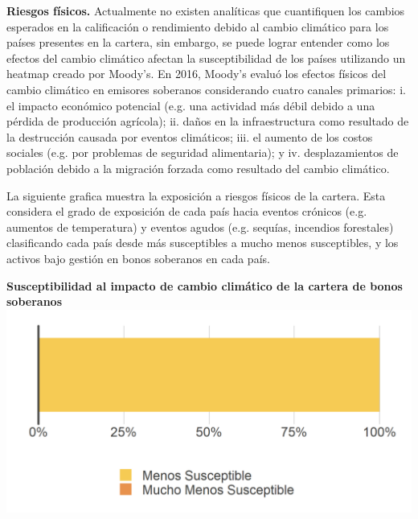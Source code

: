 \documentclass[10pt,table]{article}\usepackage[]{graphicx}\usepackage[]{color}
\begin{document}
\begin{multicols}{2}
	 
		
		\textbf{Riesgos físicos.} Actualmente no existen analíticas que cuantifiquen los cambios esperados en la calificación o rendimiento debido al cambio climático para los países presentes en la cartera, sin embargo, se puede lograr entender como los efectos del cambio climático afectan la susceptibilidad de los países utilizando un heatmap creado por Moody’s. En 2016, Moody’s evaluó los efectos físicos del cambio climático en emisores soberanos considerando cuatro canales primarios: i. el impacto económico potencial (e.g. una actividad más débil debido a una pérdida de producción agrícola); ii. daños en la infraestructura como resultado de la destrucción causada por eventos climáticos; iii. el aumento de los costos sociales (e.g. por problemas de seguridad alimentaria); y iv. desplazamientos de población debido a la migración forzada como resultado del cambio climático.
			
	La siguiente grafica muestra la exposición a riesgos físicos de la cartera. Esta considera el grado de exposición de cada país hacia eventos crónicos (e.g. aumentos de temperatura) y eventos agudos (e.g. sequías, incendios forestales) clasificando cada país desde más susceptibles a mucho menos susceptibles, y los activos bajo gestión en bonos soberanos en cada país.
	 
		
		
		\textbf{Susceptibilidad al impacto de cambio climático de la cartera de bonos soberanos}\\
		\includegraphics[trim = {0, 0, 0, 0cm},width=1\linewidth]{ReportOutputs/Fig92}
		
		
	\end{multicols}
	
\end{document}
